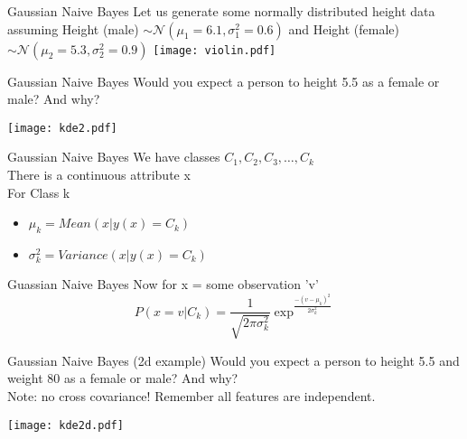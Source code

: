 \documentclass{beamer}
\begin{document}
\begin{frame}{Gaussian Naive Bayes}
    Let us generate some normally distributed height data assuming Height (male) $\sim \mathcal{N}(\mu_1 = 6.1, \sigma_1^2 = 0.6)$
 and Height (female) $\sim \mathcal{N}(\mu_2 = 5.3, \sigma_2^2 = 0.9)$
    \texttt{[image: violin.pdf]}
\end{frame}

\begin{frame}{Gaussian Naive Bayes}
    Would you expect a person to height 5.5 as a female or male? And why? 

    \texttt{[image: kde2.pdf]}
\end{frame}

\begin{frame}{Gaussian Naive Bayes}
    We have classes $C_{1}, C_{2}, C_{3},\dots, C_{k}$\\
    There is a continuous attribute x\\
    For Class k 
    \begin{itemize}
        \item $\mu_{k} = Mean(x \vert y(x) = C_{k})$
        \item $\sigma_{k}^{2} = Variance(x \vert y(x)=C_{k})$
    \end{itemize}
    
\end{frame}

\begin{frame}{Guassian Naive Bayes}
    Now for x = some observation 'v'\\
    \begin{equation*}
        P(x=v\vert C_{k}) = \frac{1}{\sqrt{2\pi \sigma_{k}^{2}}} \exp^{\frac{-(v-\mu_{k})^{2}}{2\sigma_{k}^{2}}}
    \end{equation*}
\end{frame}

\begin{frame}{Gaussian Naive Bayes (2d example)}
    Would you expect a person to height 5.5 and weight 80 as a female or male? And why? \\
    \pause Note: no cross covariance! Remember all features are independent.

    \texttt{[image: kde2d.pdf]}
\end{frame}
\end{document}
